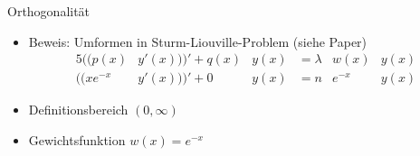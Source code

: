 \begin{frame}{Orthogonalität}
\begin{itemize}[<+->]
\item Beweis: Umformen in Sturm-Liouville-Problem (siehe Paper)
\begin{alignat*}{5}
((p(x) &y'(x)))' + q(x) &y(x) 
&=
\lambda &w(x) &y(x)
\\
((x e^{-x} &y'(x)))' + 0 &y(x)
&=
n &e^{-x} &y(x)
\end{alignat*}
\item Definitionsbereich $(0, \infty)$
\item Gewichtsfunktion $w(x) = e^{-x}$
\end{itemize}

\end{frame}